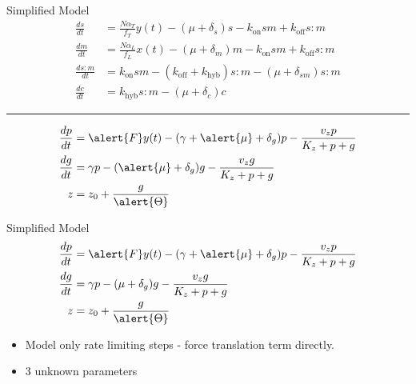 \documentclass{beamer}
\newenvironment{greyedout}{\color{gray}}{\ignorespacesafterend}
\begin{document}
\small
\begin{frame}{Simplified Model}
\begin{greyedout}
\begin{align*} 
\frac{ds}{dt} &= \frac{N\alpha_{T}}{f_{T}} y(t)-(\mu + \delta_{s})s -k_{\mathrm{on}}sm +k_{\mathrm{off}}s:m \\
\frac{dm}{dt} &=  \frac{N\alpha_{L}}{f_{L}}x(t)-(\mu + \delta_{m})m -k_{\mathrm{on}}sm +k_{\mathrm{off}}s:m  \\
\frac{ds:m}{dt} & = k_{\mathrm{on}}sm  - (k_{\mathrm{off}}+ k_{\mathrm{hyb}})s:m  -(\mu + \delta_{sm} )s:m \\
\frac{dc}{dt} & = k_{\mathrm{hyb}}s:m  -(\mu + \delta_{c})c  
\end{align*}
\end{greyedout}
\begin{center}
\rule{0.5\textwidth}{.4pt}
\end{center}
\begin{align*} 
\frac{dp}{dt} & = \alert{F}y(t)-(\gamma + \alert{\mu} + \delta_{g})p - \frac{v_{z}p}{K_{z}+p+g}   \\
\frac{dg}{dt} & = \gamma p - (\alert{\mu} + \delta_{g})g - \frac{v_{z}g}{K_{z}+p+g}  \\
z &= z_{0} +\frac{g}{\alert{\Theta}}  
\end{align*}
\end{frame}
\normalsize



\begin{frame}{Simplified Model}
\begin{align}
\frac{dp}{dt} & = \alert{F}y(t)-(\gamma + \alert{\mu} + \delta_{g})p - \frac{v_{z}p}{K_{z}+p+g}   \\
\frac{dg}{dt} & = \gamma p - (\mu + \delta_{g})g - \frac{v_{z}g}{K_{z}+p+g}  \\
z &= z_{0} +\frac{g}{\alert{\Theta}} 
\end{align}
\begin{itemize}
\item  Model only rate limiting steps - force translation term directly.
\item 3 unknown parameters
\end{itemize}
\end{frame}
\end{document}

